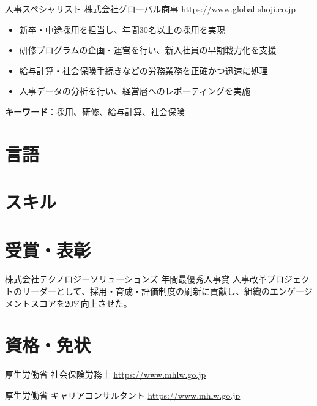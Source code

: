 \documentclass[a4paper, serif, 10pt]{moderncv}
\begin{document}
        {人事スペシャリスト}
        {株式会社グローバル商事}
        {\url{https://www.global-shoji.co.jp}}
        {}
        {\begin{itemize}
\item 新卒・中途採用を担当し、年間30名以上の採用を実現
\item 研修プログラムの企画・運営を行い、新入社員の早期戦力化を支援
\item 給与計算・社会保険手続きなどの労務業務を正確かつ迅速に処理
\item 人事データの分析を行い、経営層へのレポーティングを実施
\end{itemize}
\textbf{キーワード}：採用、研修、給与計算、社会保険}
\section{言語}

\section{スキル}

\section{受賞・表彰}

        {株式会社テクノロジーソリューションズ}
        {年間最優秀人事賞}
        {}
        {}
        {人事改革プロジェクトのリーダーとして、採用・育成・評価制度の刷新に貢献し、組織のエンゲージメントスコアを20\%向上させた。}
\section{資格・免状}

        {厚生労働省}
        {社会保険労務士}
        {\url{https://www.mhlw.go.jp}}
        {}
        {}

        {厚生労働省}
        {キャリアコンサルタント}
        {\url{https://www.mhlw.go.jp}}
        {}
        {}
\end{document}
